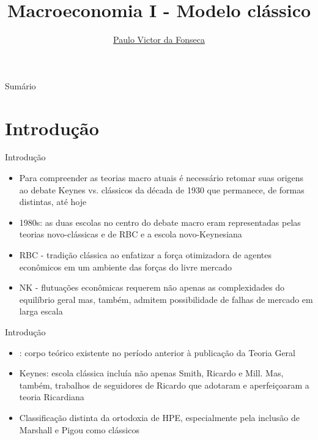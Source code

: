 \documentclass[10pt]{beamer}
\title[]{Macroeconomia I - Modelo clássico}
\author[]{\href{https://pvfonseca.github.io}{Paulo Victor da Fonseca}}
\date{}
\begin{document}
\begin{frame}[plain]
\end{frame}

\begin{frame}{Sumário}
    \tableofcontents
\end{frame}

\section{Introdução}
\begin{frame}{Introdução}
    \begin{itemize}
        \item Para compreender as teorias macro atuais é necessário retomar suas origens ao debate Keynes vs. clássicos da década de 1930 que permanece, de formas distintas, até hoje\bigskip

        \item 1980s: as duas escolas no centro do debate macro eram representadas pelas teorias novo-clássicas e de RBC e a escola novo-Keynesiana\bigskip

        \item RBC - tradição clássica ao enfatizar a força otimizadora de agentes econômicos em um ambiente das forças do livre mercado\bigskip

        \item NK - flutuações econômicas requerem não apenas as complexidades do equilíbrio geral mas, também, admitem possibilidade de falhas de mercado em larga escala
    \end{itemize}
\end{frame}

\begin{frame}{Introdução}
    \begin{itemize}
        \item {}: corpo teórico existente no período anterior à publicação da Teoria Geral\bigskip

        \item Keynes: escola clássica incluía não apenas Smith, Ricardo e Mill. Mas, também, trabalhos de seguidores de Ricardo que adotaram e aperfeiçoaram a teoria Ricardiana\bigskip

        \item Classificação distinta da ortodoxia de HPE, especialmente pela inclusão de Marshall e Pigou como clássicos
    \end{itemize}
\end{frame}
\end{document}
